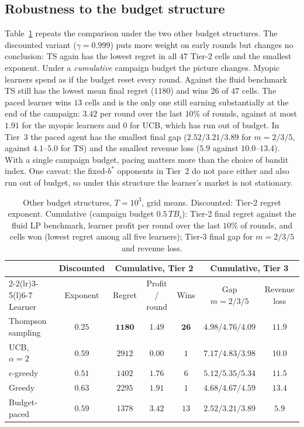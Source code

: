 \documentclass{article}
\theoremstyle{definition}
\begin{document}
\subsection{Robustness to the budget structure}
Table~\ref{tab:robust} repeats the comparison under the two other budget structures. The discounted variant
($\gamma=0.999$) puts more weight on early rounds but changes no conclusion: TS again has the lowest regret in
all $47$ Tier-2 cells and the smallest exponent. Under a \emph{cumulative} campaign budget the picture changes.
Myopic learners spend as if the budget reset every round. Against the fluid benchmark TS still has the
lowest mean final regret ($1180$) and wins $26$ of $47$ cells. The paced learner wins $13$ cells and is the
only one still earning substantially at the end of the campaign: $3.42$ per round over the last $10\%$ of
rounds, against at most $1.91$ for the myopic learners and $0$ for UCB, which has run out of budget. In Tier~3 the paced agent has the smallest final gap
($2.52/3.21/3.89$ for $m=2/3/5$, against $4.1$--$5.0$ for TS) and the smallest revenue loss ($5.9$ against
$10.0$--$13.4$). With a single campaign budget, pacing matters more than the choice of bandit index. One
caveat: the fixed-$b^\ast$ opponents in Tier~2 do not pace either and also run out of budget, so under this
structure the learner's market is not stationary.

\begin{table}[t]
\caption{Other budget structures, $T=10^3$, grid means. Discounted: Tier-2 regret exponent. Cumulative
(campaign budget $0.5\,TB_i$): Tier-2 final regret against the fluid LP benchmark, learner profit per round
over the last $10\%$ of rounds, and cells won (lowest regret among all five learners); Tier-3 final gap for $m=2/3/5$ and revenue loss.}
\label{tab:robust}
\centering\small
\begin{tabular}{@{}lcccccc@{}}
\toprule
 & Discounted & \multicolumn{3}{c}{Cumulative, Tier 2} & \multicolumn{2}{c}{Cumulative, Tier 3}\\
\cmidrule(lr){2-2}\cmidrule(lr){3-5}\cmidrule(l){6-7}
Learner & Exponent & Regret & Profit / round & Wins & Gap $m=2/3/5$ & Revenue loss\\
\midrule
Thompson sampling & $\mathbf{0.25}$ & $\mathbf{1180}$ & $1.49$ & $\mathbf{26}$ & $4.98/4.76/4.09$ & $11.9$\\
UCB, $\alpha=2$ & $0.59$ & $2912$ & $0.00$ & $1$ & $7.17/4.83/3.98$ & $10.0$\\
$\epsilon$-greedy & $0.51$ & $1402$ & $1.76$ & $6$ & $5.12/5.35/5.34$ & $11.5$\\
Greedy & $0.63$ & $2295$ & $1.91$ & $1$ & $4.68/4.67/4.59$ & $13.4$\\
Budget-paced & $0.59$ & $1378$ & $\mathbf{3.42}$ & $13$ & $\mathbf{2.52/3.21/3.89}$ & $\mathbf{5.9}$\\
\bottomrule
\end{tabular}
\end{table}
\end{document}
